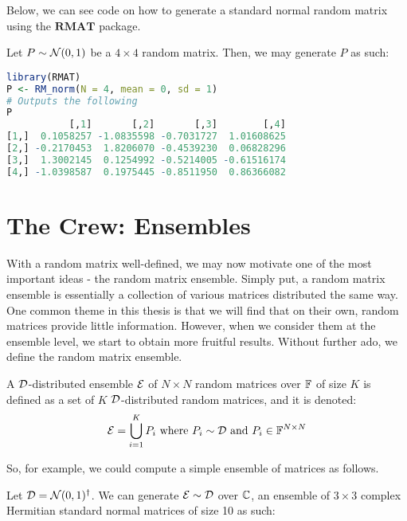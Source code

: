 \medskip
 Below, we can see code on how to generate a standard normal random matrix using the $\textbf{RMAT}$ package.
\begin{code}
Let $P \sim \mathcal{N}(0,1)$ be a $4 \times 4$ random matrix. Then, we may generate $P$ as such:
\end{code}

\begin{lstlisting}[language=R]
library(RMAT)
P <- RM_norm(N = 4, mean = 0, sd = 1)
# Outputs the following
P
           [,1]       [,2]       [,3]        [,4]
[1,]  0.1058257 -1.0835598 -0.7031727  1.01608625
[2,] -0.2170453  1.8206070 -0.4539230  0.06828296
[3,]  1.3002145  0.1254992 -0.5214005 -0.61516174
[4,] -1.0398587  0.1975445 -0.8511950  0.86366082
\end{lstlisting}


\newpage


\section{The Crew: Ensembles}

With a random matrix well-defined, we may now motivate one of the most important ideas - the random matrix ensemble.
Simply put, a random matrix ensemble is essentially a collection of various matrices distributed the same way.
One common theme in this thesis is that we will find that on their own, random matrices provide little information. However, when we consider them at the ensemble level, we start to obtain more fruitful results.
Without further ado, we define the random matrix ensemble.

\begin{definition}
A $\mathcal{D}$-distributed ensemble $\mathcal{E}$ of $N \times N$ random matrices over $\mathbb{F}$ of size $K$ is defined as a set of $K$ $\mathcal{D}$-distributed random matrices, and it is denoted:
$$ \mathcal{E} = \bigcup_{i = 1}^K P_i \text{ where } P_i \sim \mathcal{D} \text{ and } P_i \in \mathbb{F}^{N \times N} $$
\end{definition}

\medskip
 So, for example, we could compute a simple ensemble of matrices as follows.
\begin{code}
Let $\mathcal{D} = \mathcal{N}(0,1)^{\dagger}$. We can generate $\mathcal{E} \sim \mathcal{D}$ over $\mathbb{C}$, an ensemble of $3 \times 3$ complex Hermitian standard normal matrices of size 10 as such:
\end{code}

